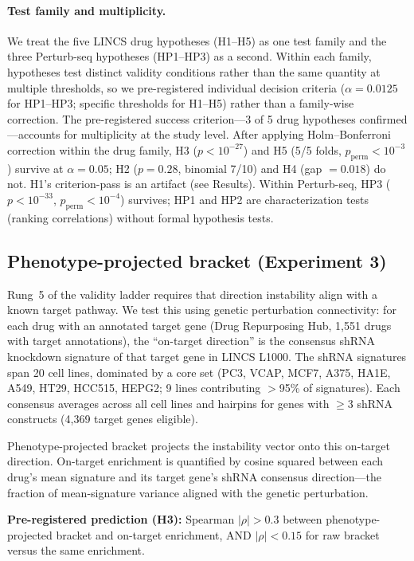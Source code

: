 \documentclass{article}
\begin{document}
\paragraph{Test family and multiplicity.}
We treat the five LINCS drug hypotheses (H1--H5) as one test family and the
three Perturb-seq hypotheses (HP1--HP3) as a second. Within each family,
hypotheses test distinct validity conditions rather than the same quantity at
multiple thresholds, so we pre-registered individual decision criteria
($\alpha = 0.0125$ for HP1--HP3; specific thresholds for H1--H5) rather than
a family-wise correction. The pre-registered success criterion---3 of 5 drug
hypotheses confirmed---accounts for multiplicity at the study level.
After applying Holm--Bonferroni correction within the drug family, H3
($p < 10^{-27}$) and H5 (5/5 folds, $p_{\text{perm}} < 10^{-3}$) survive at
$\alpha = 0.05$; H2 ($p = 0.28$, binomial 7/10) and H4 (gap $= 0.018$)
do not. H1's criterion-pass is an artifact (see Results). Within Perturb-seq,
HP3 ($p < 10^{-33}$, $p_{\text{perm}} < 10^{-4}$) survives; HP1 and HP2 are characterization tests
(ranking correlations) without formal hypothesis tests.

\subsection{Phenotype-projected bracket (Experiment 3)}

Rung~5 of the validity ladder requires that direction instability align with
a known target pathway. We test this using genetic perturbation connectivity:
for each drug with an annotated target gene (Drug Repurposing Hub,
1{,}551 drugs with target annotations), the ``on-target direction'' is the
consensus shRNA knockdown signature of that target gene in LINCS L1000.
The shRNA signatures span 20 cell lines, dominated by a core set
(PC3, VCAP, MCF7, A375, HA1E, A549, HT29, HCC515, HEPG2; 9 lines
contributing $>$95\% of signatures). Each consensus averages across all
cell lines and hairpins for genes with $\geq$3 shRNA constructs
(4{,}369 target genes eligible).

Phenotype-projected bracket projects the instability vector onto this
on-target direction. On-target enrichment is quantified by cosine squared
between each drug's mean signature and its target gene's shRNA consensus
direction---the fraction of mean-signature variance aligned with the
genetic perturbation.

\textbf{Pre-registered prediction (H3):} Spearman $|\rho| > 0.3$ between
phenotype-projected bracket and on-target enrichment, AND $|\rho| < 0.15$
for raw bracket versus the same enrichment.
\end{document}
